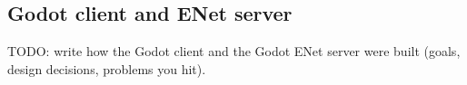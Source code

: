 \documentclass[11pt]{article}
\begin{document}
\subsection{Godot client and ENet server}
TODO: write how the Godot client and the Godot ENet server were built (goals, design decisions, problems you hit).
\end{document}
